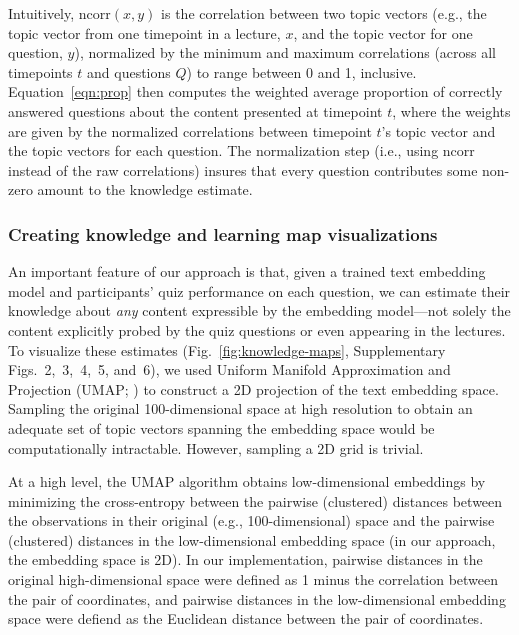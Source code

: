 \documentclass[10pt]{article}
\newcommand{\individualKnowledgeMapsA}{2}
\newcommand{\individualKnowledgeMapsB}{3}
\newcommand{\individualKnowledgeMapsC}{4}
\newcommand{\individualLearningMapsA}{5}
\newcommand{\individualLearningMapsB}{6}
\begin{document}
Intuitively, $\mathrm{ncorr}(x, y)$ is the correlation between two topic
vectors (e.g., the topic vector from one timepoint in a lecture, $x$, and the
topic vector for one question, $y$), normalized by the minimum and maximum
correlations (across all timepoints $t$ and questions $Q$) to range between 0 and 1,
inclusive. Equation~\ref{eqn:prop} then computes the weighted average
proportion of correctly answered questions about the content presented at
timepoint $t$, where the weights are given by the normalized correlations
between timepoint $t$'s topic vector and the topic vectors for each question.
The normalization step (i.e., using $\mathrm{ncorr}$ instead of the raw
correlations) insures that every question
contributes some non-zero amount to the knowledge estimate.

\subsubsection*{Creating knowledge and learning map visualizations}\label{subsec:knowledge-maps}

An important feature of our approach is that, given a trained text embedding
model and participants' quiz performance on each question, we can estimate
their knowledge about \textit{any} content expressible by the embedding
model---not solely the content explicitly probed by the quiz questions or even
appearing in the lectures. To visualize these estimates
(Fig.~\ref{fig:knowledge-maps}, Supplementary Figs.~\individualKnowledgeMapsA,~\individualKnowledgeMapsB,~\individualKnowledgeMapsC,~\individualLearningMapsA,
and~\individualLearningMapsB), we used Uniform Manifold Approximation and
Projection (UMAP; \citealp{McInEtal18a}) to construct a 2D projection of the
text embedding space. Sampling the original 100-dimensional space at high
resolution to obtain an adequate set of topic vectors spanning the embedding
space would be computationally intractable. However, sampling a 2D grid is
trivial.

At a high level, the UMAP algorithm obtains low-dimensional embeddings by
minimizing the cross-entropy between the pairwise (clustered) distances between
the observations in their original (e.g., 100-dimensional) space and the
pairwise (clustered) distances in the low-dimensional embedding space (in our
approach, the embedding space is 2D). In our implementation, pairwise distances
in the original high-dimensional space were defined as 1 minus the correlation
between the pair of coordinates, and pairwise distances in the low-dimensional
embedding space were defiend as the Euclidean distance between the pair of
coordinates.
\end{document}
